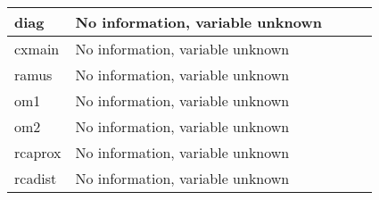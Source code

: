 \documentclass[a4paper,12pt]{article}
\begin{document}
\begin{adjustbox}{width=1\textwidth}
\begin{tabular}{|l|l|l|l|l|}
diag          & No information, variable unknown                               &               &                                                                                                                                                                                                                                                                &                     \\ \hline
cxmain        & No information, variable unknown                               &               &                                                                                                                                                                                                                                                               &                     \\ \hline
ramus         & No information, variable unknown                               &               &                                                                                                                                                                                                                                                                &                     \\ \hline
om1           & No information, variable unknown                               &               &                                                                                                                                                                                                                                                                &                     \\ \hline
om2           & No information, variable unknown                               &               &                                                                                                                                                                                                                                                               &                     \\ \hline
rcaprox       & No information, variable unknown                               &               &                                                                                                                                                                                                                                                                &                     \\ \hline
rcadist       & No information, variable unknown                               &               &                                                                                                                                                                                                                                                                &                     \\ \hline

\end{tabular}
\end{adjustbox}
\end{document}
